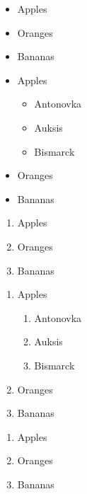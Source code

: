 \documentclass[12pt]{article}
\begin{document}
\begin{itemize}
	\item Apples 
	\item Oranges
	\item Bananas
\end{itemize}

\begin{itemize}
		\item Apples
		\begin{itemize}
			\item Antonovka
			\item Auksis
			\item Bismarck 
		\end{itemize}
		\item Oranges
		\item Bananas
	\end{itemize}

	\begin{enumerate}
		\item Apples
		\item Oranges
		\item Bananas
	\end{enumerate}


	\begin{enumerate}
	\item Apples
	\begin{enumerate}
		\item Antonovka
		\item Auksis
		\item Bismarck
	\end{enumerate}
	\item Oranges
	\item Bananas
\end{enumerate}


\begin{enumerate}[label=\Alph*]
	\item Apples
	\item Oranges
	\item Bananas
\end{enumerate}
\end{document}
